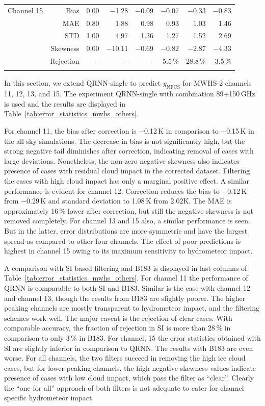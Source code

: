\documentclass[amt, manuscript]{copernicus}
\newcommand{\ynfcs}{y_\text{NFCS}}
\begin{document}
\begin{table}[t]
\begin{tabular}{lrrr|rr|rr}
		\middlehline
		Channel 15  &  Bias     & 0.00 & $-$1.28 &$-$0.09 &$-$0.07 &$-$0.33 &$-$0.83\\
					&  MAE      & 0.80 &   1.88 &  0.98 &  0.93 &  1.03 &  1.46\\
					&  STD      & 1.00 &   4.97 &  1.36 &  1.27 &  1.52 &  2.69\\
					&  Skewness & 0.00 &$-$10.11 &$-$0.69 &$-$0.82 &$-$2.87 & $-$4.33 \\ 
					& Rejection & -     & -      & -	 & 5.5\,\% & 28.8\,\%& 3.5\,\%  \\
		\bottomhline
	\end{tabular}
\end{table}

In this section, we extend QRNN-single to predict $\ynfcs$ for MWHS-2 channels 11, 12, 13, and 15. The experiment QRNN-single with combination 89+150\,GHz is used and the results are displayed in Table~\ref{tab:error_statistics_mwhs_others}.

For channel 11, the bias after correction is $-$0.12\,K in comparison to $-$0.15\,K in the all-sky simulations. The decrease in bias is not significantly high, but the strong negative tail  diminishes after correction, indicating removal of cases with large deviations. Nonetheless, the non-zero negative skewness also indicates presence of cases with residual cloud impact in the corrected dataset. Filtering the cases with high cloud impact has only a marginal positive effect. A similar performance is evident for channel 12. Correction reduces the bias to $-$0.12\,K from $-$0.29\,K and standard deviation to 1.08\,K from 2.02\.K. The MAE is approximately 16\,\% lower after correction, but still the negative skewness is not removed completely. For channel 13 and 15 also, a similar performance is seen. But in the latter, error distributions are more symmetric and have the largest spread as compared to other four channels. The effect of poor predictions is highest in channel 15 owing to its maximum sensitivity to hydrometeor impact.

A comparison with SI based filtering and B183 is displayed in last columns of Table~\ref{tab:error_statistics_mwhs_others}. For channel 11 the performance of QRNN is comparable to both SI and B183. Similar is the case with channel 12 and channel 13, though the results from B183 are slightly poorer. The higher peaking channels are mostly transparent to hydrometeor impact, and the filtering schemes work well. The major caveat is the rejection of clear cases. With comparable accuracy, the fraction of rejection in SI is more than 28\,\% in comparison to only 3\,\% in B183. For channel, 15 the error statistics obtained with SI are slightly inferior in comparison to QRNN. The results with B183 are even worse. For all channels, the two filters succeed in removing the high ice cloud cases, but for lower peaking channels, the high negative skewness values indicate presence of cases with low cloud impact, which pass the filter as ``clear''. Clearly the ``one for all'' approach of both filters is not adequate to cater for channel specific hydrometeor impact.  
\end{document}
